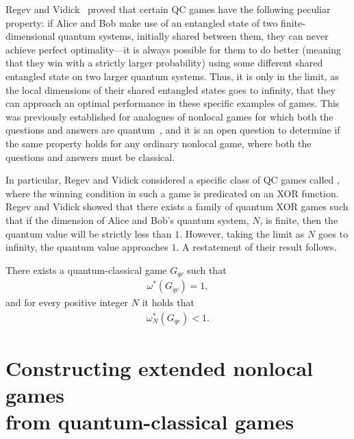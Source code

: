 Regev and Vidick~\cite{Regev2013} proved that certain QC games have the following peculiar property: if Alice and Bob make use of an entangled state of two finite-dimensional quantum systems, initially shared between them, they can never achieve perfect optimality---it is always possible for them to do better (meaning that they win with a strictly larger probability) using some different shared entangled state on two larger quantum systems. Thus, it is only in the limit, as the local dimensions of their shared entangled states goes to infinity, that they can approach an optimal performance in these specific examples of games. This was previously established for analogues of nonlocal games for which both the questions and answers are quantum~\cite{Leung2013}, and it is an open question to determine if the same property holds for any ordinary nonlocal game, where both the questions and answers must be classical.

In particular, Regev and Vidick considered a specific class of QC games called , where the winning condition in such a game is predicated on an XOR function. Regev and Vidick showed that there exists a family of quantum XOR games such that if the dimension of Alice and Bob's quantum system, $N$, is finite, then the quantum value will be strictly less than $1$. However, taking the limit as $N$ goes to infinity, the quantum value approaches $1$. A restatement of their result follows. 
\begin{theorem} \label{thm:regev-vidick-qcg}
	There exists a quantum-classical game $G_{qc}$ such that 
	\begin{align}
		\omega^*(G_{qc}) = 1,
	\end{align}
and for every positive integer $N$ it holds that 
	\begin{align}
		\omega_N^*(G_{qc}) < 1.
	\end{align}
\end{theorem}

\section[Constructing extended nonlocal games from quantum-classical games]{Constructing extended nonlocal games \\ from quantum-classical games} \label{sec:constructing-extended-nonlocal-games-from-quantum-classical-games}

